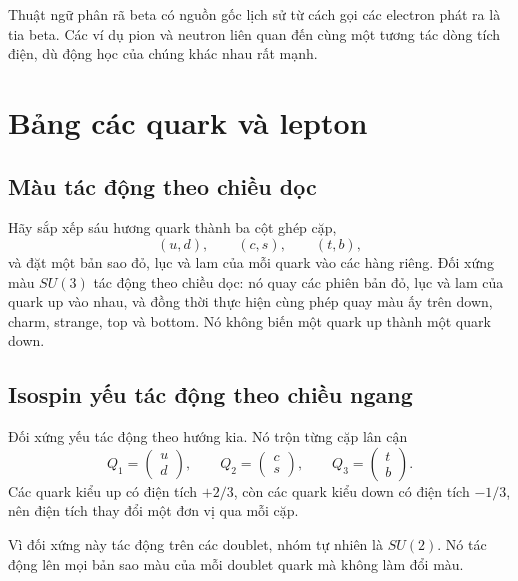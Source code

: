 Thuật ngữ phân rã beta có nguồn gốc lịch sử từ cách gọi các electron phát ra là tia beta. Các ví dụ pion và neutron liên quan đến cùng một tương tác dòng tích điện, dù động học của chúng khác nhau rất mạnh.

\section{Bảng các quark và lepton}

\subsection{Màu tác động theo chiều dọc}

Hãy sắp xếp sáu hương quark thành ba cột ghép cặp,
\begin{equation}
(u,d),\qquad(c,s),\qquad(t,b),
\end{equation}
và đặt một bản sao đỏ, lục và lam của mỗi quark vào các hàng riêng. Đối xứng màu \(SU(3)\) tác động theo chiều dọc: nó quay các phiên bản đỏ, lục và lam của quark up vào nhau, và đồng thời thực hiện cùng phép quay màu ấy trên down, charm, strange, top và bottom. Nó không biến một quark up thành một quark down.

\subsection{Isospin yếu tác động theo chiều ngang}

Đối xứng yếu tác động theo hướng kia. Nó trộn từng cặp lân cận
\begin{equation}
Q_1=\begin{pmatrix}u\\d\end{pmatrix},
\qquad
Q_2=\begin{pmatrix}c\\s\end{pmatrix},
\qquad
Q_3=\begin{pmatrix}t\\b\end{pmatrix}.
\label{eq:l5-quark-doublets}
\end{equation}
Các quark kiểu up có điện tích \(+2/3\), còn các quark kiểu down có điện tích \(-1/3\), nên điện tích thay đổi một đơn vị qua mỗi cặp.

Vì đối xứng này tác động trên các doublet, nhóm tự nhiên là \(SU(2)\). Nó tác động lên mọi bản sao màu của mỗi doublet quark mà không làm đổi màu.

